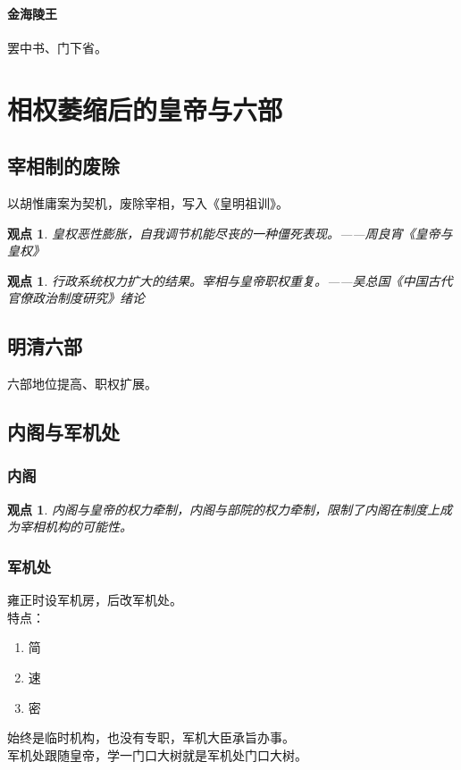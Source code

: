 \documentclass[twoside]{article}
\newtheorem{claim}[theorem]{观点}
\begin{document}
\paragraph{金海陵王}
罢中书、门下省。

\section{相权萎缩后的皇帝与六部}
\subsection{宰相制的废除}
以胡惟庸案为契机，废除宰相，写入《皇明祖训》。
\begin{claim}
    皇权恶性膨胀，自我调节机能尽丧的一种僵死表现。——周良宵《皇帝与皇权》
\end{claim}
\begin{claim}
    行政系统权力扩大的结果。宰相与皇帝职权重复。——吴总国《中国古代官僚政治制度研究》绪论
\end{claim}
\subsection{明清六部}
六部地位提高、职权扩展。
\subsection{内阁与军机处}
\subsubsection{内阁}
\begin{claim}
    内阁与皇帝的权力牵制，内阁与部院的权力牵制，限制了内阁在制度上成为宰相机构的可能性。
\end{claim}
\subsubsection{军机处}
雍正时设军机房，后改军机处。\\
特点：
\begin{enumerate}
    \item 简
    \item 速
    \item 密
\end{enumerate}
始终是临时机构，也没有专职，军机大臣承旨办事。\\
军机处跟随皇帝，学一门口大树就是军机处门口大树。
\end{document}
